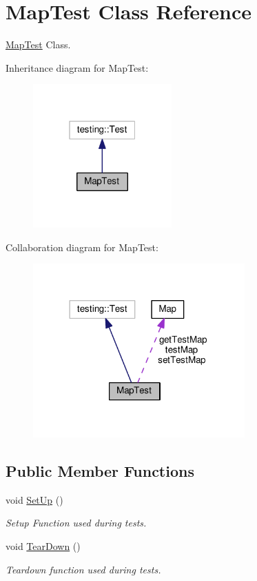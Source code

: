 \hypertarget{classMapTest}{}\section{Map\+Test Class Reference}
\label{classMapTest}


\hyperlink{classMapTest}{Map\+Test} Class.  




Inheritance diagram for Map\+Test\+:
\nopagebreak
\begin{figure}[H]
\begin{center}
\leavevmode
\includegraphics[width=151pt]{classMapTest__inherit__graph}
\end{center}
\end{figure}


Collaboration diagram for Map\+Test\+:
\nopagebreak
\begin{figure}[H]
\begin{center}
\leavevmode
\includegraphics[width=230pt]{classMapTest__coll__graph}
\end{center}
\end{figure}
\subsection*{Public Member Functions}
\begin{DoxyCompactItemize}
\item 
void \hyperlink{classMapTest_a24e2117680abf39f0a8c87c7fffa45fd}{Set\+Up} ()
\begin{DoxyCompactList}\small\item\em Setup Function used during tests. \end{DoxyCompactList}\item 
void \hyperlink{classMapTest_a4114fafbb5db18eb0052123d062ba18a}{Tear\+Down} ()
\begin{DoxyCompactList}\small\item\em Teardown function used during tests. \end{DoxyCompactList}\end{DoxyCompactItemize}
